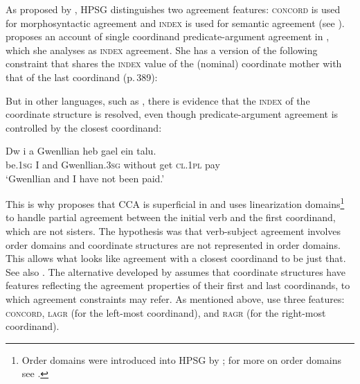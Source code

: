 As proposed by \citet[Chapter~2]{wechsler}, HPSG distinguishes two agreement features: \textsc{concord} is used for
morphosyntactic agreement and \textsc{index} is used for semantic agreement (see
). \citet{Moosally} proposes an account
of single coordinand predicate-argument agreement in , which she analyses as  \textsc{index} agreement. She has  a version of the following 
constraint that shares the \textsc{index} value of the (nominal) coordinate mother with that of the
last coordinand (p.\,389):

\ea
{}
\z


But in other languages, such as , there is evidence that the \textsc{index} of the coordinate
structure is resolved, even though predicate-argument agreement is controlled by the closest coordinand: 

\ea 
\gll Dw              i a   Gwenllian              heb     gael ein                      talu.\footnotemark\\
     be.1\textsc{sg} I and Gwenllian.3\textsc{sg} without get  \textsc{cl}.1\textsc{pl} pay \\
\glt  `Gwenllian and I have not been paid.'
\z

\noindent
This is why \citet{Borsley:2009} proposes that CCA is superficial in  and uses
linearization domains\label{page-linearization-domains-in-coordination-one}\footnote{%
  Order domains were introduced into HPSG by \citet{Reape94a}; for more on order domains see
  .
} to handle partial agreement between the initial verb and the first coordinand, which are not sisters.
The hypothesis  was that verb-subject agreement involves order domains and coordinate structures are
not represented in order domains. This allows what looks like agreement with a closest coordinand to
be just that. See also . The alternative developed by \citet{Villavicencio:Sadler:ea:05} assumes that
coordinate structures have features reflecting the agreement properties of their first and last
coordinands, to which agreement constraints may refer. As mentioned above,
\citet{Villavicencio:Sadler:ea:05} use three features: \textsc{concord}, \textsc{lagr} (for the
left-most coordinand), and \textsc{ragr} (for the right-most coordinand). 


